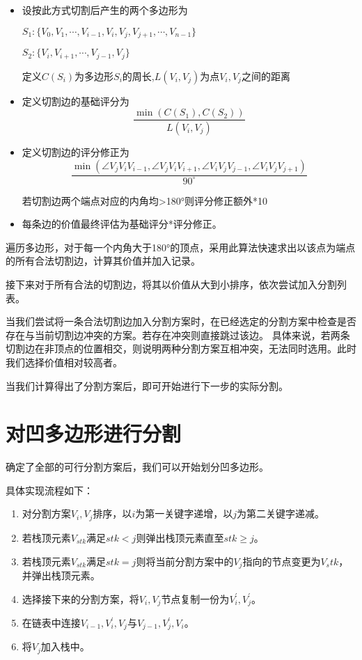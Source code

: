 \begin{itemize}
    \item 设按此方式切割后产生的两个多边形为

    \(S_1:\{ V_0,V_1,\cdots,V_{i-1},V_i,V_j,V_{j+1},\cdots,V_{n-1}\} \)

    \(S_2:\{ V_i,V_{i+1},\cdots,V_{j-1},V_j\}\)

    定义\(C(S_i)\)为多边形\(S_i\)的周长,\quad \(L(V_i,V_j)\)为点\(V_i,V_j\)之间的距离

    \item 定义切割边的基础评分为
    \begin{equation}
        \frac {\min(C(S_1),C(S_2))}{L(V_i,V_j)}
    \end{equation}
    \item 定义切割边的评分修正为
    \begin{equation}
        \frac {\min(\angle V_jV_iV_{i-1},\angle V_jV_iV_{i+1},\angle V_iV_jV_{j-1},\angle V_iV_jV_{j+1})}{90^\circ}
    \end{equation}

    若切割边两个端点对应的内角均>180°则评分修正额外*10

    \item 每条边的价值最终评估为基础评分*评分修正。
    
\end{itemize}

遍历多边形，对于每一个内角大于180°的顶点，采用此算法快速求出以该点为端点的所有合法切割边，计算其价值并加入记录。

接下来对于所有合法的切割边，将其以价值从大到小排序，依次尝试加入分割列表。

当我们尝试将一条合法切割边加入分割方案时，在已经选定的分割方案中检查是否存在与当前切割边冲突的方案。若存在冲突则直接跳过该边。
具体来说，若两条切割边在非顶点的位置相交，则说明两种分割方案互相冲突，无法同时选用。此时我们选择价值相对较高者。

当我们计算得出了分割方案后，即可开始进行下一步的实际分割。

\section{对凹多边形进行分割}

确定了全部的可行分割方案后，我们可以开始划分凹多边形。

具体实现流程如下：
\begin{enumerate}
    \item 对分割方案\(V_i,V_j\)排序，以\(i\)为第一关键字递增，以\(j\)为第二关键字递减。
    \item 若栈顶元素\(V_{stk}\)满足\(stk<j\)则弹出栈顶元素直至\(stk\ge j\)。
    \item 若栈顶元素\(V_{stk}\)满足\(stk=j\)则将当前分割方案中的\(V_j\)指向的节点变更为\(V_stk\)，并弹出栈顶元素。
    \item 选择接下来的分割方案，将\(V_i,V_j\)节点复制一份为\(V_{i}^{'},V_{j}^{'}\)。
    \item 在链表中连接\(V_{i-1},V_i^{'},V_j\)与\(V_{j-1},V_j^{'},V_i\)。
    \item 将\(V_j\)加入栈中。
\end{enumerate}

